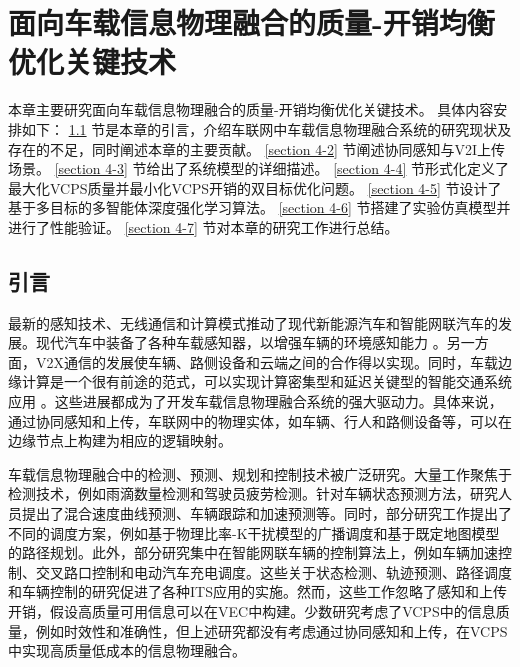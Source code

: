 \chapter[面向车载信息物理融合的质量-开销均衡优化关键技术]{面向车载信息物理融合的质量-开销均衡优化关键技术}

本章主要研究面向车载信息物理融合的质量-开销均衡优化关键技术。
具体内容安排如下：
\ref{section 4-1} 节是本章的引言，介绍车联网中车载信息物理融合系统的研究现状及存在的不足，同时阐述本章的主要贡献。
\ref{section 4-2} 节阐述协同感知与V2I上传场景。
\ref{section 4-3} 节给出了系统模型的详细描述。
\ref{section 4-4} 节形式化定义了最大化VCPS质量并最小化VCPS开销的双目标优化问题。
\ref{section 4-5} 节设计了基于多目标的多智能体深度强化学习算法。
\ref{section 4-6} 节搭建了实验仿真模型并进行了性能验证。
\ref{section 4-7} 节对本章的研究工作进行总结。

\section{引言}\label{section 4-1}

最新的感知技术、无线通信和计算模式推动了现代新能源汽车和智能网联汽车的发展。现代汽车中装备了各种车载感知器，以增强车辆的环境感知能力 \cite{zhu2017overview}。另一方面，V2X通信\cite{chen2020a}的发展使车辆、路侧设备和云端之间的合作得以实现。同时，车载边缘计算\cite{dai2021edge}是一个很有前途的范式，可以实现计算密集型和延迟关键型的智能交通系统应用 \cite{zhao2022foundation}。这些进展都成为了开发车载信息物理融合系统的强大驱动力。具体来说，通过协同感知和上传，车联网中的物理实体，如车辆、行人和路侧设备等，可以在边缘节点上构建为相应的逻辑映射。

车载信息物理融合中的检测、预测、规划和控制技术被广泛研究。大量工作聚焦于检测技术，例如雨滴数量检测\cite{wang2021deep}和驾驶员疲劳检测\cite{chang2018design}。针对车辆状态预测方法，研究人员提出了混合速度曲线预测\cite{zhang2019a}、车辆跟踪\cite{iepure2021a}和加速预测\cite{zhang2020data}等。同时，部分研究工作提出了不同的调度方案，例如基于物理比率-K干扰模型的广播调度\cite{li2020cyber}和基于既定地图模型的路径规划\cite{lian2021cyber}。此外，部分研究集中在智能网联车辆的控制算法上，例如车辆加速控制\cite{lv2018driving}、交叉路口控制\cite{chang2021an}和电动汽车充电调度\cite{wi2013electric}。这些关于状态检测、轨迹预测、路径调度和车辆控制的研究促进了各种ITS应用的实施。然而，这些工作忽略了感知和上传开销，假设高质量可用信息可以在VEC中构建。少数研究考虑了VCPS中的信息质量，例如时效性\cite{liu2014temporal, dai2019temporal}和准确性\cite{rager2017scalability, yoon2021performance}，但上述研究都没有考虑通过协同感知和上传，在VCPS中实现高质量低成本的信息物理融合。

